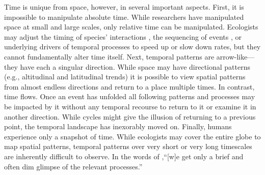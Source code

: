 \documentclass[11pt,a4paper,oneside]{article}
\begin{document}
Time is unique from space, however, in several important aspects. First, it is impossible to manipulate absolute time. While researchers have manipulated space at small \citep[e.g.,][]{huffaker} and large \citep[e.g.,][]{Terborgh:2001bw} scales, only relative time can be manipulated. Ecologists may adjust the timing of species' interactions \citep{Yang:2010cq}, the sequencing of events \citep{vannette2014}, or underlying drivers of temporal processes to speed up or slow down rates, but they cannot fundamentally alter time itself. Next, temporal patterns are arrow-like---they have each a singular direction. While space may have directional patterns (e.g., altitudinal and latitudinal trends) it is possible to view spatial patterns from almost endless directions and return to a place multiple times. In contrast, time flows. Once an event has unfolded all following patterns and processes may be impacted by it without any temporal recourse to return to it or examine it in another direction. While cycles might give the illusion of returning to a previous point, the temporal landscape has inexorably moved on. Finally, humans experience only a snapshot of time. While ecologists may cover the entire globe to map spatial patterns, temporal patterns over very short or very long timescales are inherently difficult to observe. In the words of \citet{wiens1986},``[w]e get only a brief and often dim glimpse of the relevant processes.'' \\

\\
\end{document}
